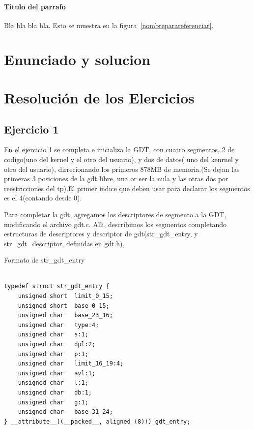\documentclass[a4paper]{article}
\newenvironment{codesnippet}{%
	\begin{Sbox}\begin{minipage}{\textwidth}\sffamily\small}%
	{\end{minipage}\end{Sbox}%
		\begin{center}%
		\vspace{-0.4cm}\colorbox{litegrey}{\TheSbox}\end{center}\vspace{0.3cm}}
\begin{document}
\paragraph{\textbf{Titulo del parrafo} } Bla bla bla bla.
Esto se muestra en la figura~\ref{nombreparareferenciar}.






\section{Enunciado y solucion} 
%

\newpage
\section{Resolución de los Elercicios}
\subsection{Ejercicio 1}

En el ejercicio 1 se completa e inicializa la GDT, con cuatro segmentos, 2 de codigo(uno del kernel y el otro del usuario), y dos de datos( uno del kenrnel y otro del usuario), dirrecionando los primeros 878MB de memoria.(Se dejan las primeras 3 posiciones de la gdt libre, una or ser la nula y las otras dos por reestricciones del tp).El primer indice que deben usar para declarar los segmentos es el 4(contando desde 0).


Para completar la gdt, agregamos los descriptores de segmento a la GDT, modificando el archivo gdt.c.
Alli, describimos los segmentos completando  estructuras de descriptores y descriptor de gdt(str_gdt_entry, y  str_gdt_descriptor, definidas en gdt.h),


Formato de str_gdt_entry

\begin{codesnippet}
\begin{verbatim}

typedef struct str_gdt_entry {
    unsigned short  limit_0_15;
    unsigned short  base_0_15;
    unsigned char   base_23_16;
    unsigned char   type:4;
    unsigned char   s:1;
    unsigned char   dpl:2;
    unsigned char   p:1;
    unsigned char   limit_16_19:4;
    unsigned char   avl:1;
    unsigned char   l:1;
    unsigned char   db:1;
    unsigned char   g:1;
    unsigned char   base_31_24;
} __attribute__((__packed__, aligned (8))) gdt_entry;

    
\end{verbatim}
\end{codesnippet}
\end{document}

